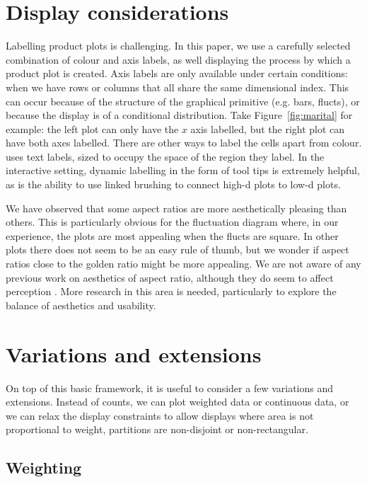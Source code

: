 \documentclass[journal]{vgtc}
\begin{document}
\section{Display considerations}
\label{sec:display}

Labelling product plots is challenging. In this paper, we use a carefully selected combination of colour and axis labels, as well displaying the process by which a product plot is created. Axis labels are only available under certain conditions: when we have rows or columns that all share the same dimensional index. This can occur because of the structure of the graphical primitive (e.g. bars, flucts), or because the display is of a conditional distribution. Take Figure~\ref{fig:marital} for example: the left plot can only have the $x$ axis labelled, but the right plot can have both axes labelled. There are other ways to label the cells apart from colour. \citep{slingsby:2009} uses text labels, sized to occupy the space of the region they label. In the interactive setting, dynamic labelling in the form of tool tips is extremely helpful, as is the ability to use linked brushing to connect high-d plots to low-d plots.

We have observed that some aspect ratios are more aesthetically pleasing than others. This is particularly obvious for the fluctuation diagram where, in our experience, the plots are most appealing when the flucts are square. In other plots there does not seem to be an easy rule of thumb, but we wonder if aspect ratios close to the golden ratio might be more appealing. We are not aware of any previous work on aesthetics of aspect ratio, although they do seem to affect perception \citep{kong:2010}. More research in this area is needed, particularly to explore the balance of aesthetics and usability.


\section{Variations and extensions}
\label{sec:variations}

On top of this basic framework, it is useful to consider a few variations and extensions. Instead of counts, we can plot weighted data or continuous data, or we can relax the display constraints to allow displays where area is not proportional to weight, partitions are non-disjoint or non-rectangular.

\subsection{Weighting}
\label{sub:weighting}
\end{document}
